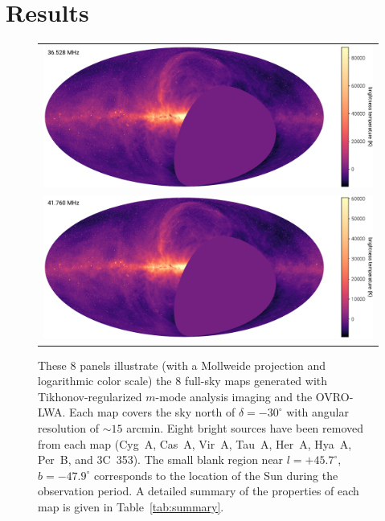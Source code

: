 \documentclass[twocolumn]{aastex61}
\begin{document}
\section{Results}\label{sec:results}

\begin{figure}[ht]
    \centering
    \begin{tabular}{c}
        \includegraphics[height=0.32\textheight]{figures/channel-maps/spw04} \\
        \includegraphics[height=0.32\textheight]{figures/channel-maps/spw06} \\
    \end{tabular}
    \caption{
        These 8 panels illustrate (with a Mollweide projection and logarithmic color scale) the 8
        full-sky maps generated with Tikhonov-regularized $m$-mode analysis imaging and the
        OVRO-LWA.  Each map covers the sky north of $\delta=-30^\circ$ with angular resolution of
        $\sim15$ arcmin. Eight bright sources have been removed from each map (Cyg~A, Cas~A, Vir~A,
        Tau~A, Her~A, Hya~A, Per~B, and 3C~353). The small blank region near $l=+45.7^\circ$,
        $b=-47.9^\circ$ corresponds to the location of the Sun during the observation period.  A
        detailed summary of the properties of each map is given in Table~\ref{tab:summary}.
    }
    \label{fig:channel-maps}
\end{figure}
\end{document}
